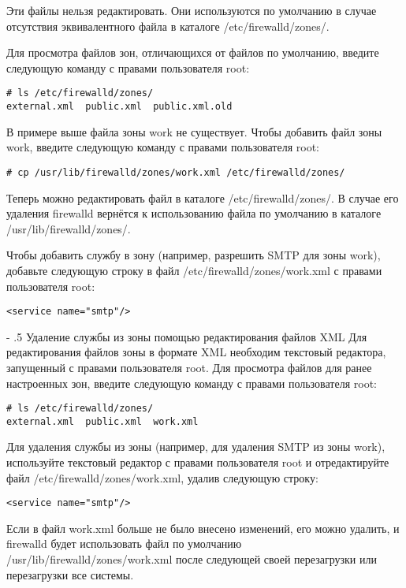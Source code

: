 \documentclass[a4paper,10pt,twoside]{article}
\makeatletter
\renewcommand\paragraph{%
   \@startsection{paragraph}{4}{0mm}%
      {-\baselineskip}%
      {.5\baselineskip}%
      {\normalfont\normalsize\bfseries}}
\makeatother
\begin{document}
Эти файлы нельзя редактировать. Они используются по умолчанию в случае отсутствия эквивалентного файла в каталоге /etc/firewalld/zones/.

Для просмотра файлов зон, отличающихся от файлов по умолчанию, введите следующую команду с правами пользователя root: 
\begin{verbatim}
# ls /etc/firewalld/zones/
external.xml  public.xml  public.xml.old
\end{verbatim} 

В примере выше файла зоны work не существует. Чтобы добавить файл зоны work, введите следующую команду с правами пользователя root: 
\begin{verbatim}
# cp /usr/lib/firewalld/zones/work.xml /etc/firewalld/zones/
\end{verbatim} 

Теперь можно редактировать файл в каталоге /etc/firewalld/zones/. В случае его удаления firewalld вернётся к использованию файла по умолчанию в каталоге /usr/lib/firewalld/zones/.

Чтобы добавить службу в зону (например, разрешить SMTP для зоны work), добавьте следующую строку в файл /etc/firewalld/zones/work.xml с правами пользователя root: 

\begin{verbatim}
<service name="smtp"/>
\end{verbatim} 


\paragraph{Удаление службы из зоны  помощью редактирования файлов XML}
Для редактирования файлов зоны в формате XML необходим текстовый редактора, запущенный с правами пользователя root.  Для просмотра файлов для ранее настроенных зон, введите следующую команду с правами пользователя root:  
\begin{verbatim}
# ls /etc/firewalld/zones/
external.xml  public.xml  work.xml
\end{verbatim} 

Для удаления службы из зоны (например, для удаления SMTP из зоны work), используйте текстовый редактор с правами пользователя root и отредактируйте файл  /etc/firewalld/zones/work.xml, удалив следующую строку:
\begin{verbatim}
<service name="smtp"/>
\end{verbatim} 

Если в файл work.xml больше не было внесено изменений, его можно удалить, и firewalld будет использовать файл по умолчанию 
⁠⁠ /usr/lib/firewalld/zones/work.xml после следующей своей перезагрузки или перезагрузки все системы.
\end{document}
